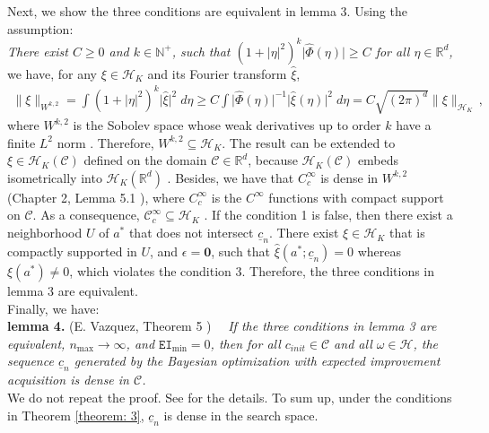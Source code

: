 Next, we show the three conditions are equivalent in lemma 3. Using the assumption:\\
\emph{
There exist $C\ge 0$ and $k \in\mathbb{N}^+$, such that
$(1+|\eta|^2)^k \big|\hat{\Phi}(\eta)\big|\ge C$ for all $\eta\in \mathbb{R}^d$,}\\
we have,
for any $\xi\in \mathcal{H}_K$ and its Fourier transform $\hat{\xi}$, 
\begin{equation*}\begin{split}
    \big\|\xi\big\|_{W^{k,2}} = 
    \int (1+|\eta|^2)^k \big| \hat{\xi} \big|^2 \; d\eta 
    \ge C \int \big|\hat{\Phi}(\eta)\big|^{-1} \big|\hat{\xi}(\eta)\big|^2 \; d\eta
    = C \sqrt{(2\pi)^d} \big\|\xi\big\|_{\mathcal{H}_K}\,,
\end{split}
\label{space equal}
\end{equation*}
where $W^{k,2}$ is the Sobolev space whose weak derivatives up to order $k$ 
have a finite $L^2$ norm
\cite{converge Bull}. Therefore, $W^{k,2}\subseteq \mathcal{H}_K$.
The result can be extended to $\xi \in \mathcal{H}_K(\mathcal{C})$ defined on the domain 
$\mathcal{C}\in \mathbb{R}^d$, because $\mathcal{H}_K(\mathcal{C})$ embeds isometrically
into $\mathcal{H}_K(\mathbb{R}^d)$ \cite{RKHS aronszajn}. Besides, we have that
$C_c^\infty$ is dense in $W^{k,2}$ (Chapter 2, Lemma 5.1 \cite{Hilbert space Showalter Book}),
where $C_c^\infty$ is the $C^\infty$ functions with compact support on $\mathcal{C}$.
As a consequence, $\mathcal{C}^\infty_c\subseteq \mathcal{H}_K$ \cite{convergen EI}.
If the condition 1 is false, 
then there exist a neighborhood
$U$ of $a^*$ that does not intersect $\underline{c}_n$. There exist $\xi\in \mathcal{H}_K$ 
that is compactly supported in $U$,
and $\epsilon = \textbf{0}$,
such that $\hat{\xi}(a^*; \underline{c}_n) = 0$ whereas
$\xi(a^*) \neq 0$, which violates the condition 3.
Therefore, the three conditions in lemma 3 are equivalent.\\

Finally, we have:\\
\textbf{lemma 4.} (E. Vazquez, Theorem 5 \cite{convergen EI})$\quad$ 
\emph{If the three conditions in
lemma 3 are equivalent, $n_{\max}\rightarrow \infty$, and $\texttt{EI}_{\min}=0$,
then for all $c_{init}\in \mathcal{C}$ and all $\omega \in \mathcal{H}$, the sequence 
$\underline{c}_n$ generated by the Bayesian optimization with expected improvement acquisition 
is dense in $\mathcal{C}$.
}\\
We do not repeat the proof. See \cite{convergen EI} for the details. 
To sum up, under the conditions in Theorem 
\ref{theorem: 3}, $\underline{c}_n$ is dense in the search space.
\hfill\qedsymbol



